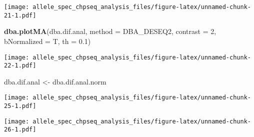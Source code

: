 \documentclass[
]{article}
\newenvironment{Shaded}{\begin{snugshade}}{\end{snugshade}}
\newcommand{\CommentTok}[1]{\textcolor[rgb]{0.56,0.35,0.01}{\textit{#1}}}
\newcommand{\DataTypeTok}[1]{\textcolor[rgb]{0.13,0.29,0.53}{#1}}
\newcommand{\DecValTok}[1]{\textcolor[rgb]{0.00,0.00,0.81}{#1}}
\newcommand{\FloatTok}[1]{\textcolor[rgb]{0.00,0.00,0.81}{#1}}
\newcommand{\KeywordTok}[1]{\textcolor[rgb]{0.13,0.29,0.53}{\textbf{#1}}}
\newcommand{\NormalTok}[1]{#1}
\newcommand{\OperatorTok}[1]{\textcolor[rgb]{0.81,0.36,0.00}{\textbf{#1}}}
\newcommand{\StringTok}[1]{\textcolor[rgb]{0.31,0.60,0.02}{#1}}
\begin{document}
\texttt{[image: allele\_spec\_chpseq\_analysis\_files/figure-latex/unnamed-chunk-21-1.pdf]}

\begin{Shaded}
\begin{Highlighting}[]
\KeywordTok{dba.plotMA}\NormalTok{(dba.dif.anal, }\DataTypeTok{method =}\NormalTok{ DBA_DESEQ2, }\DataTypeTok{contrast =} \DecValTok{2}\NormalTok{, }\DataTypeTok{bNormalized =}\NormalTok{ T, }\DataTypeTok{th =} \FloatTok{0.1}\NormalTok{)}
\end{Highlighting}
\end{Shaded}

\texttt{[image: allele\_spec\_chpseq\_analysis\_files/figure-latex/unnamed-chunk-22-1.pdf]}

\begin{Shaded}
\begin{Highlighting}[]
\NormalTok{dba.dif.anal <-}\StringTok{ }\NormalTok{dba.dif.anal.norm}
\end{Highlighting}
\end{Shaded}

\begin{Shaded}
\end{Shaded}

\texttt{[image: allele\_spec\_chpseq\_analysis\_files/figure-latex/unnamed-chunk-25-1.pdf]}

\begin{Shaded}
\end{Shaded}

\texttt{[image: allele\_spec\_chpseq\_analysis\_files/figure-latex/unnamed-chunk-26-1.pdf]}
\end{document}
